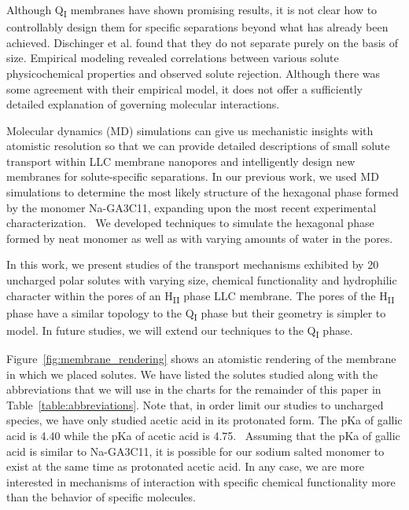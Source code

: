 \documentclass[journal=jpcbfk,manuscript=article]{achemso}
\begin{document}
  Although Q\textsubscript{I} membranes have shown promising results, it
  is not clear how to controllably design them for specific separations
  beyond what has already been achieved. Dischinger et al. found that they
  do not separate purely on the basis of size. Empirical modeling revealed
  correlations between various solute physicochemical properties and 
  observed solute rejection. Although there was some agreement with their
  empirical model, it does not offer a sufficiently detailed explanation
  of governing molecular interactions.~\cite{dischinger_effect_2017}

  Molecular dynamics (MD) simulations can give us mechanistic insights with
  atomistic resolution so that we can provide detailed descriptions of small
  solute transport within LLC membrane nanopores and intelligently design new
  membranes for solute-specific separations. In our previous work, we used MD
  simulations to determine the most likely structure of the hexagonal phase
  formed by the monomer Na-GA3C11, expanding upon the most recent experimental
  characterization.~\cite{coscia_understanding_2019,feng_thin_2016} We developed
  techniques to simulate the hexagonal phase formed by neat monomer as well as
  with varying amounts of water in the pores.
 
  In this work, we present studies of the transport mechanisms exhibited by 20
  uncharged polar solutes with varying size, chemical functionality and
  hydrophilic character within the pores of an H\textsubscript{II} phase LLC
  membrane. The pores of the H\textsubscript{II} phase have a similar topology to
  the Q\textsubscript{I} phase but their geometry is simpler to model. In future
  studies, we will extend our techniques to the Q\textsubscript{I} phase. 

  Figure~\ref{fig:membrane_rendering} shows an atomistic rendering of the
  membrane in which we placed solutes. We have listed the solutes studied along
  with the abbreviations that we will use in the charts for the remainder of this
  paper in Table~\ref{table:abbreviations}. Note that, in order limit our
  studies to uncharged species, we have only studied acetic acid in its
  protonated form. The pKa of gallic acid is 4.40 while the pKa of acetic acid is
  4.75.~\cite{chuysinuan_gallic_2009,perrin_pka_1981} Assuming that the pKa of
  gallic acid is similar to Na-GA3C11, it is possible for our sodium salted
  monomer to exist at the same time as protonated acetic acid. In any case, we
  are more interested in mechanisms of interaction with specific chemical
  functionality more than the behavior of specific molecules.
\end{document}
